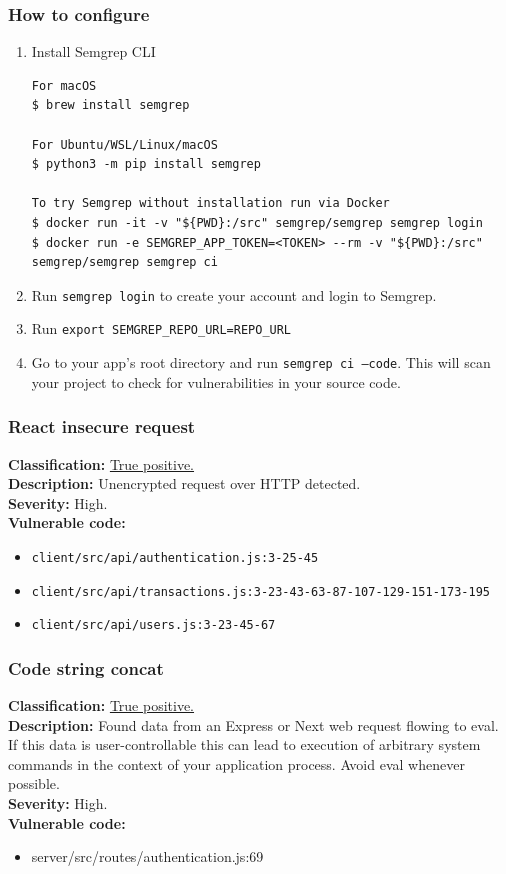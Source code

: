 \documentclass[]{article}
\begin{document}
\subsubsection{How to configure}
 
\begin{enumerate}
\item Install Semgrep CLI
\begin{lstlisting}[numbers=none]
For macOS
$ brew install semgrep

For Ubuntu/WSL/Linux/macOS
$ python3 -m pip install semgrep

To try Semgrep without installation run via Docker
$ docker run -it -v "${PWD}:/src" semgrep/semgrep semgrep login
$ docker run -e SEMGREP_APP_TOKEN=<TOKEN> --rm -v "${PWD}:/src" semgrep/semgrep semgrep ci
\end{lstlisting}
\item Run \texttt{semgrep login} to create your account and login to Semgrep. 
\item Run \texttt{export SEMGREP\_REPO\_URL=REPO\_URL}
\item Go to your app's root directory and run \texttt{semgrep ci --code}. This will scan your project to check for vulnerabilities in your source code.
\end{enumerate}

\subsubsection{React insecure request}
\textbf{Classification:} \hyperref[subsubsec:cleartext_transmission_of_sensitive_information]{True positive.} \\ 
\textbf{Description:} Unencrypted request over HTTP detected. \\ 
\textbf{Severity:} High. \\ 
\textbf{Vulnerable code:} 
\begin{itemize}
    \item \texttt{client/src/api/authentication.js:3-25-45}
    \item \texttt{client/src/api/transactions.js:3-23-43-63-87-107-129-151-173-195}
    \item \texttt{client/src/api/users.js:3-23-45-67}
\end{itemize}

\subsubsection{Code string concat}
\textbf{Classification:} \hyperref[subsubsec:improper_neutralization_of_directives_in_dynamically_evaluated_code]{True positive.} \\ 
\textbf{Description:} Found data from an Express or Next web request flowing to eval. If this data is user-controllable this can 
lead to execution of arbitrary system commands in the context of your application process. Avoid eval whenever possible. \\ 
\textbf{Severity:} High. \\ 
\textbf{Vulnerable code:} 
\begin{itemize}
    \item server/src/routes/authentication.js:69
\end{itemize}
\end{document}
